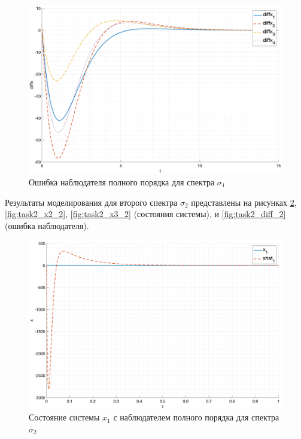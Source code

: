 \begin{figure}[ht!]
    \centering
    \includegraphics[width=\textwidth]{media/plots/task2_diffx_1.png}
    \caption{Ошибка наблюдателя полного порядка для спектра $\sigma_1$}
    \label{fig:task2_diff_1}
\end{figure}


Результаты моделирования для второго спектра $\sigma_2$ представлены на рисунках \ref{fig:task2_x1_2}, \ref{fig:task2_x2_2}, \ref{fig:task2_x3_2} (состояния системы), и \ref{fig:task2_diff_2} (ошибка наблюдателя).
\begin{figure}[ht!]
    \centering
    \includegraphics[width=\textwidth]{media/plots/task2_x1_2.png}
    \caption{Состояние системы $x_1$ с наблюдателем полного порядка для спектра $\sigma_2$}
    \label{fig:task2_x1_2}
\end{figure}

